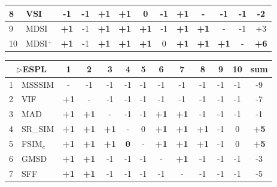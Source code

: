 \begin{table*}[htb]
{\begin{tabular}{|l|l|c|c|c|c|c|c|c|c|c|c||c|}
8           & VSI              & -1          & -1 & \textbf{+1} & \textbf{+1} & 0           & -1          & \textbf{+1} & -           & -1          & -1          & -2          \\ \hline
9           & MDSI             & \textbf{+1} & -1 & \textbf{+1} & \textbf{+1} & \textbf{+1} & -1          & \textbf{+1} & \textbf{+1} & -           & -1          & +3          \\ \hline
10          & MDSI$^+$            & \textbf{+1} & -1 & \textbf{+1} & \textbf{+1} & \textbf{+1} & 0           & \textbf{+1} & \textbf{+1} & \textbf{+1} & -           & \textbf{+6} \\ \hline
\end{tabular}
\hspace*{2 mm}
\begin{tabular}{|l|l|c|c|c|c|c|c|c|c|c|c||c|}
\hline
\multicolumn{2}{|c|}{$\rhd$ESPL} & 1           & 2           & 3           & 4           & 5           & 6           & 7           & 8           & 9  & 10          & sum         \\ \hline
1         & MSSSIM         & -           & -1          & -1          & -1          & -1          & -1          & -1          & -1          & -1 & -1          & -9          \\ \hline
2         & VIF            & \textbf{+1} & -           & -1          & -1          & -1          & -1          & -1          & -1          & -1 & -1          & -7          \\ \hline
3         & MAD            & \textbf{+1} & \textbf{+1} & -           & -1          & -1          & \textbf{+1} & \textbf{+1} & -1          & -1 & -1          & -1          \\ \hline
4         & SR\_SIM        & \textbf{+1} & \textbf{+1} & \textbf{+1} & -           & 0           & \textbf{+1} & \textbf{+1} & \textbf{+1} & -1 & 0           & \textbf{+5} \\ \hline
5         & FSIM$_c$          & \textbf{+1} & \textbf{+1} & \textbf{+1} & \textbf{0}  & -           & \textbf{+1} & \textbf{+1} & \textbf{+1} & -1 & 0           & \textbf{+5} \\ \hline
6         & GMSD           & \textbf{+1} & \textbf{+1} & -1          & -1          & -1          & -           & \textbf{+1} & -1          & -1 & -1          & -3          \\ \hline
7         & SFF            & \textbf{+1} & \textbf{+1} & -1          & -1          & -1          & -1          & -           & -1          & -1 & -1          & -5          \\ \hline

\end{tabular}}
\end{table*}
